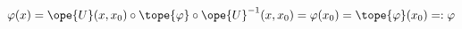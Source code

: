 \begin{equation}	\label{12.130}
\varphi(x)
= \ope{U}(x,x_0)\circ \tope{\varphi} \circ \ope{U}^{-1}(x,x_0)
= \varphi(x_0)
= \tope{\varphi}(x_0)
=: \varphi
	\end{equation}

